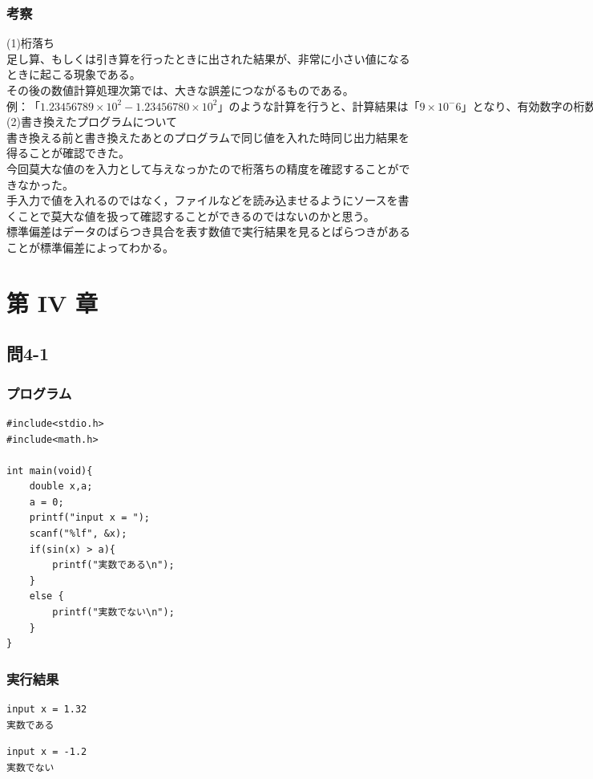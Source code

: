 \documentclass{jarticle}
\begin{document}
\subsubsection{考察\\}
(1)桁落ち\\
足し算、もしくは引き算を行ったときに出された結果が、非常に小さい値になるときに起こる現象である。\\
その後の数値計算処理次第では、大きな誤差につながるものである。\\
$例：「1.23456789×10^2-1.23456780×10^2」のような計算を行うと、計算結果は「9×10^-6」となり、有効数字の桁数は9桁から一気に1桁に減少してしまう。$\\
(2)書き換えたプログラムについて\\
書き換える前と書き換えたあとのプログラムで同じ値を入れた時同じ出力結果を得ることが確認できた。\\
今回莫大な値のを入力として与えなっかたので桁落ちの精度を確認することができなかった。\\
手入力で値を入れるのではなく，ファイルなどを読み込ませるようにソースを書くことで莫大な値を扱って確認することができるのではないのかと思う。\\
標準偏差はデータのばらつき具合を表す数値で実行結果を見るとばらつきがあることが標準偏差によってわかる。\\


\section{第 IV 章\\}
\subsection{問4-1\\}
\subsubsection{プログラム\\}
\begin{breakbox}
\begin{verbatim}
#include<stdio.h>
#include<math.h>

int main(void){
    double x,a;
    a = 0;
    printf("input x = ");
    scanf("%lf", &x);
    if(sin(x) > a){
        printf("実数である\n");
    }
    else {
        printf("実数でない\n");
    }
}
\end{verbatim}
\end{breakbox}
\subsubsection{実行結果\\}
\begin{breakbox}
\begin{verbatim}
input x = 1.32
実数である
\end{verbatim}
\end{breakbox}
\begin{breakbox}
\begin{verbatim}
input x = -1.2
実数でない
\end{verbatim}
\end{breakbox}
\end{document}
